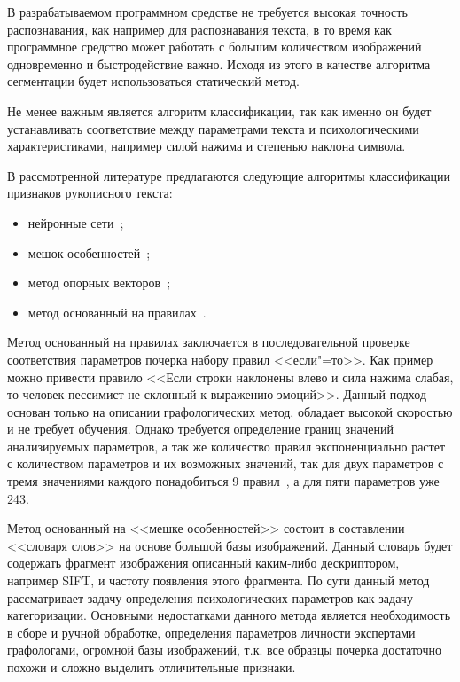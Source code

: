 В разрабатываемом программном средстве не требуется высокая точность распознавания, как например для распознавания текста, в то время как программное средство может работать с большим количеством изображений одновременно и быстродействие важно. Исходя из этого в качестве алгоритма сегментации будет использоваться статический метод.

Не менее важным является алгоритм классификации, так как именно он будет устанавливать соответствие между параметрами текста и психологическими характеристиками, например силой нажима и степенью наклона символа.

В рассмотренной литературе предлагаются следующие алгоритмы классификации признаков рукописного текста:
\begin{itemize}
  \item нейронные сети~\cite{champa_ananda_kumar_ann, grewal_prashar, gabrani_solomon_dviwe,puri_lakhwani, dang_kumar, kathait_singh};
  \item мешок особенностей~\cite{rothacker_bag_of_features};
  \item метод опорных векторов~\cite{slideshare_khandelwal_garg, gabrani_solomon_dviwe, prasad_singh_sapre};
  \item метод основанный на правилах~\cite{champa_ananda_kumar_rule_base}.
\end{itemize}

Метод основанный на правилах заключается в последовательной проверке соответствия параметров почерка набору правил <<если"=то>>. Как пример можно привести правило <<Если строки наклонены влево и сила нажима слабая, то человек пессимист не склонный к выражению эмоций>>. Данный подход основан только на описании графологических метод, обладает высокой скоростью и не требует обучения. Однако требуется определение границ значений анализируемых параметров, а так же количество правил экспоненциально растет с количеством параметров и их возможных значений, так для двух параметров с тремя значениями каждого понадобиться 9 правил~\cite{champa_ananda_kumar_rule_base}, а для пяти параметров уже 243.

Метод основанный на <<мешке особенностей>> состоит в составлении <<словаря слов>> на основе большой базы изображений. Данный словарь будет содержать фрагмент изображения описанный каким-либо дескриптором, например SIFT, и частоту появления этого фрагмента. По сути данный метод рассматривает задачу определения психологических параметров как задачу категоризации. Основными недостатками данного метода является необходимость в сборе и ручной обработке, определения параметров личности экспертами графологами, огромной базы изображений, т.к. все образцы почерка достаточно похожи и сложно выделить отличительные признаки.

